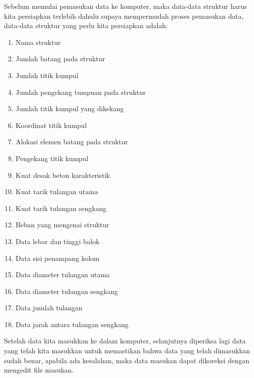 Sebelum memulai pemasukan data ke komputer, maka data-data struktur harus
kita persiapkan terlebih dahulu supaya mempermudah proses pemasukan data,
data-data struktur yang perlu kita persiapkan adalah:
\begin{enumerate}[label=\arabic*.]
\item Nama struktur
\item Jumlah batang pada struktur
\item Jumlah titik kumpul
\item Jumlah pengekang tumpuan pada struktur
\item Jumlah titik kumpul yang dikekang
\item Koordinat titik kumpul
\item Alokasi elemen batang pada struktur
\item Pengekang titik kumpul
\item Kuat desak beton karakteristik
\item Kuat tarik tulangan utama
\item Kuat tarik tulangan sengkang
\item Beban yang mengenai struktur
\item Data lebar dan tinggi balok
\item Data sisi penampang kolom
\item Data diameter tulangan utama
\item Data diameter tulangan sengkang
\item Data jumlah tulangan
\item Data jarak antara tulangan sengkang
\end{enumerate}
Setelah data kita masukkan ke dalam komputer, selanjutnya diperiksa lagi
data yang telah kita masukkan untuk memastikan bahwa data yang telah
dimasukkan sudah benar, apabila ada kesalahan, maka data masukan dapat
dikoreksi dengan mengedit file masukan.

